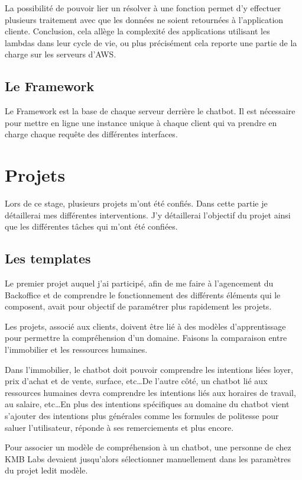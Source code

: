 \documentclass[12pt,a4paper,oneside]{scrreprt}
\begin{document}
La possibilité de pouvoir lier un résolver à une fonction permet d'y effectuer plusieurs traitement avec que les données ne soient retournées à l'application cliente. Conclusion, cela allège la complexité des applications utilisant les lambdas dans leur cycle de vie, ou plus précisément cela reporte une partie de la charge sur les serveurs d'AWS.

\section{Le Framework}

Le Framework est la base de chaque serveur derrière le chatbot. Il est nécessaire pour mettre en ligne une instance unique à chaque client qui va prendre en charge chaque requête des différentes interfaces.

\chapter{Projets}

Lors de ce stage, plusieurs projets m'ont été confiés. Dans cette partie je détaillerai mes différentes interventions. J'y détaillerai l'objectif du projet ainsi que les différentes tâches qui m'ont été confiées.

\section{Les templates}

Le premier projet auquel j'ai participé, afin de me faire à l'agencement du Backoffice et de comprendre le fonctionnement des différents éléments qui le composent, avait pour objectif de paramétrer plus rapidement les projets.

Les projets, associé aux clients, doivent être lié à des modèles d'apprentissage pour permettre la compréhension d'un domaine. Faisons la comparaison entre l'immobilier et les ressources humaines.

Dans l'immobilier, le chatbot doit pouvoir comprendre les intentions liées loyer, prix d'achat et de vente, surface, etc\dots De l'autre côté, un chatbot lié aux ressources humaines devra comprendre les intentions liés aux horaires de travail, au salaire, etc\dots En plus des intentions spécifiques au domaine du chatbot vient s'ajouter des intentions plus générales comme les formules de politesse pour saluer l'utilisateur, réponde à ses remerciements et plus encore.


\begin{problem}
Pour associer un modèle de compréhension à un chatbot, une personne de chez KMB Labs devaient jusqu'alors sélectionner manuellement dans les paramètres du projet ledit modèle.
\end{problem}
\end{document}
